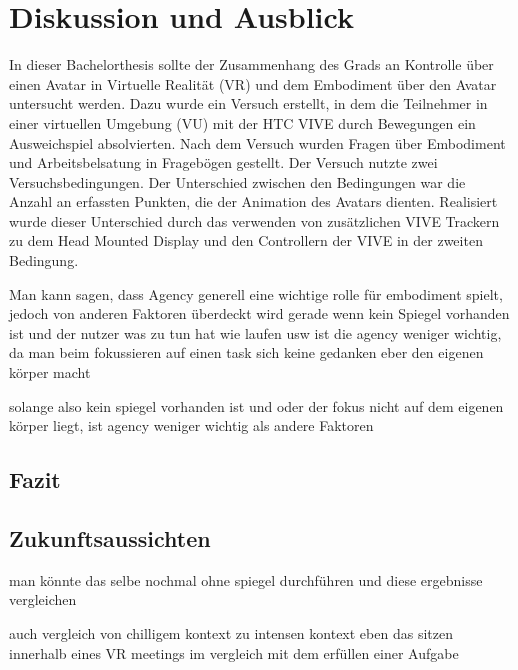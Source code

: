 \chapter{Diskussion und Ausblick}
In dieser Bachelorthesis sollte der Zusammenhang des Grads an Kontrolle über einen Avatar in Virtuelle Realität (VR) und dem Embodiment über den Avatar untersucht werden.
Dazu wurde ein Versuch erstellt, in dem die Teilnehmer in einer virtuellen Umgebung (VU) mit der HTC VIVE durch Bewegungen ein Ausweichspiel absolvierten. Nach dem Versuch wurden Fragen über Embodiment und Arbeitsbelsatung in Fragebögen gestellt. 
Der Versuch nutzte zwei Versuchsbedingungen. Der Unterschied zwischen den Bedingungen war die Anzahl an erfassten Punkten, die der Animation des Avatars dienten. Realisiert wurde dieser Unterschied durch das verwenden von zusätzlichen VIVE Trackern zu dem Head Mounted Display und den Controllern der VIVE in der zweiten Bedingung.



Man kann sagen, dass Agency generell eine wichtige rolle für embodiment spielt, jedoch von anderen Faktoren überdeckt wird
gerade wenn kein Spiegel vorhanden ist und der nutzer was zu tun hat wie laufen usw ist die agency weniger wichtig, da man beim fokussieren auf einen task sich keine gedanken eber den eigenen körper macht

solange also kein spiegel vorhanden ist und oder der fokus nicht auf dem eigenen körper liegt, ist agency weniger wichtig als andere Faktoren

\section{Fazit}

\section{Zukunftsaussichten}


man könnte das selbe nochmal ohne spiegel durchführen und diese ergebnisse vergleichen

auch vergleich von chilligem kontext zu intensen kontext
eben das sitzen innerhalb eines VR meetings im vergleich mit dem erfüllen einer Aufgabe
